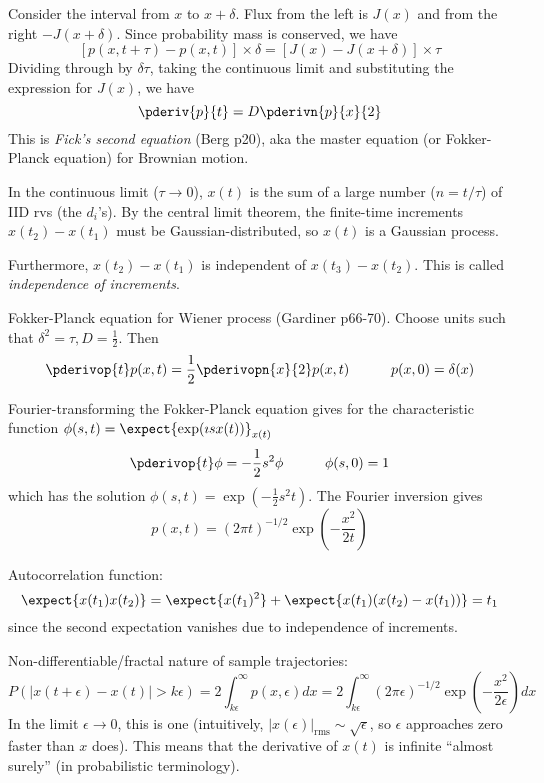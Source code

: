 \documentclass{beamer}
\begin{document}
\begin{frame}{}
Consider the interval from $x$ to $x+\delta$. Flux from the left is $J(x)$ and from the right $-J(x+\delta)$.
Since probability mass is conserved, we have
\[
[p(x,t+\tau) - p(x,t)] \times \delta = [J(x) - J(x+\delta)] \times \tau
\]
Dividing through by $\delta \tau$, taking the continuous limit and substituting the expression for $J(x)$, we have
\[
\pderiv{p}{t} = D \pderivn{p}{x}{2}
\]
This is {\em Fick's second equation} (Berg p20), aka the master equation (or Fokker-Planck equation) for Brownian motion.
  \item In the continuous limit ($\tau \to 0$),
$x(t)$ is the sum of a large number ($n=t/\tau$) of IID rvs (the $d_i$'s).
By the central limit theorem, the finite-time increments $x(t_2)-x(t_1)$ must be Gaussian-distributed,
so $x(t)$ is a Gaussian process.
  \item Furthermore, $x(t_2)-x(t_1)$ is independent of $x(t_3)-x(t_2)$. This is called {\em independence of increments}.
  \iteme
 \iteme
 \item Fokker-Planck equation for Wiener process (Gardiner p66-70). Choose units such that $\delta^2 = \tau, D=\frac{1}{2}$.
Then
\[
\pderivop{t} p(x,t) = \frac{1}{2} \pderivopn{x}{2} p(x,t)
\quad\quad\quad
p(x,0) = \delta(x)
\]
 \item Fourier-transforming the Fokker-Planck equation gives for the characteristic function
$\phi(s,t) = \expect{\exp(\imath sx(t))}_{x(t)}$
\[
\pderivop{t} \phi = -\frac{1}{2} s^2 \phi
\quad\quad\quad
\phi(s,0) = 1
\]
which has the solution $\phi(s,t) = \exp(-\frac{1}{2}s^2 t)$.
The Fourier inversion gives
\[
p(x,t) = (2\pi t)^{-1/2} \exp \left( -\frac{x^2}{2t} \right)
\]
 \item Autocorrelation function:
\[
\expect{x(t_1)x(t_2)} = \expect{x(t_1)^2} + \expect{x(t_1)(x(t_2)-x(t_1))} = t_1
\]
since the second expectation vanishes due to independence of increments.
 \item Non-differentiable/fractal nature of sample trajectories:
\[
P(|x(t+\epsilon) - x(t)| > k\epsilon) = 2\int_{k\epsilon}^\infty p(x,\epsilon) dx
= 2\int_{k\epsilon}^\infty (2\pi \epsilon)^{-1/2} \exp \left( -\frac{x^2}{2\epsilon} \right) dx
\]
In the limit $\epsilon \to 0$, this is one
(intuitively, $|x(\epsilon)|_{\mbox{rms}} \sim \sqrt{\epsilon}$, so $\epsilon$ approaches zero faster than $x$ does).
This means that the derivative of $x(t)$ is infinite  ``almost surely'' (in probabilistic terminology).

\end{frame}
\end{document}
